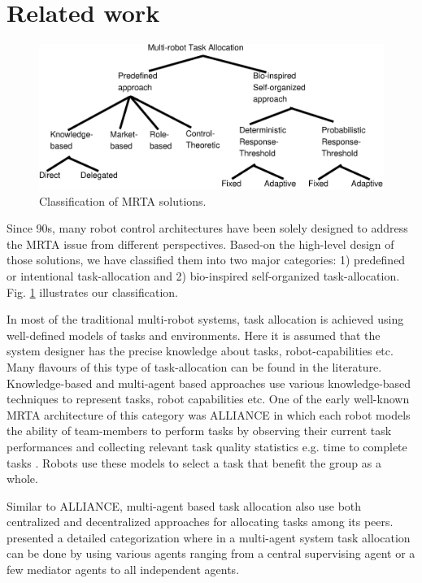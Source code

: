 \documentclass[final,5p,times,twocolumn]{elsarticle}
\begin{document}
\section{Related work}
\label{sec:bg}
\begin{figure}
\centering
\includegraphics[width=0.7\linewidth, angle=0]
{./images/ta-categories.eps}
\caption{Classification of MRTA solutions.}
\label{fig:mrta-classification} %
\end{figure}
Since 90s, many robot control architectures   have been solely designed to address the MRTA issue from different perspectives. Based-on the high-level design of those solutions, we have classified them into two major categories: 1) predefined or intentional task-allocation and 2) bio-inspired self-organized task-allocation. Fig. \ref{fig:mrta-classification} illustrates our classification.

In most of the traditional multi-robot systems, task allocation is achieved using well-defined models of tasks and environments. Here it is assumed that the system designer has the precise knowledge about tasks, robot-capabilities etc. Many flavours of this type of task-allocation can be found in the literature. Knowledge-based and multi-agent based approaches use various knowledge-based techniques to represent tasks, robot capabilities etc. One of the early well-known MRTA architecture of this category was ALLIANCE  in which each robot models the ability of team-members to perform tasks by observing their current task performances and collecting relevant task quality statistics e.g. time to complete tasks \cite{Parker1998}. Robots use these models to select a task that benefit  the group as a whole. 

Similar to  ALLIANCE, multi-agent based task allocation also  use both centralized and decentralized approaches for allocating tasks among  its  peers. \citet{Shen+2001} presented a detailed categorization where in a multi-agent system task allocation can be done by using various agents ranging from a central supervising agent or a few mediator agents to  all independent agents. 
\end{document}
